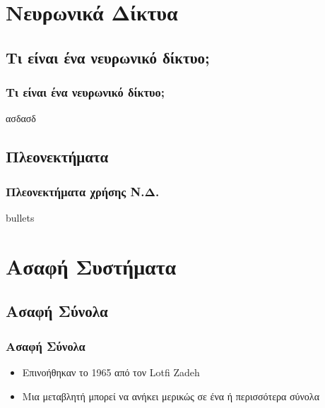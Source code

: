 \documentclass[xetex,serif,mathserif,14pt]{beamer}
\begin{document}

\section{Νευρωνικά Δίκτυα} %

\subsection{Τι είναι ένα νευρωνικό δίκτυο;}

\begin{frame}
\frametitle{Τι είναι ένα νευρωνικό δίκτυο;}
ασδασδ

\end{frame}


\subsection{Πλεονεκτήματα}

\begin{frame}
\frametitle{Πλεονεκτήματα χρήσης Ν.Δ.}
bullets
\end{frame}


\section{Ασαφή Συστήματα}

\subsection{Ασαφή Σύνολα}

\begin{frame}
\frametitle{Ασαφή Σύνολα}
\begin{itemize}
  \item Επινοήθηκαν το 1965 από τον Lotfi Zadeh\pause
  \item Μια μεταβλητή μπορεί να ανήκει μερικώς σε ένα ή περισσότερα σύνολα
\end{itemize}
\end{frame}

%
\end{document}
